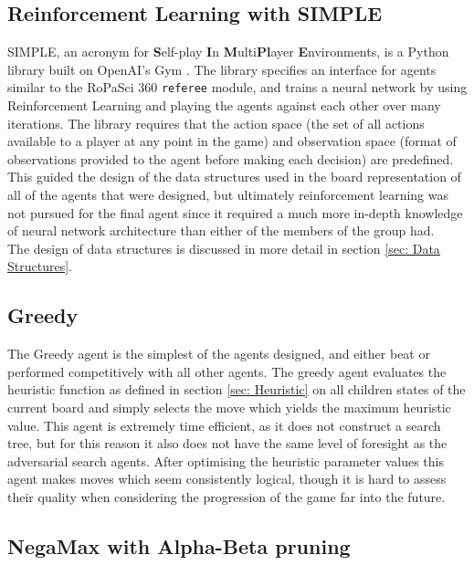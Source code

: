 \documentclass{article}
\begin{document}
\subsection{Reinforcement Learning with SIMPLE \cite{SIMPLE}}
SIMPLE, an acronym for \textbf{S}elf-play \textbf{I}n \textbf{M}ulti\textbf{Pl}ayer \textbf{E}nvironments, is a Python library built on OpenAI's Gym \cite{brockman2016openai}. The library specifies an interface for agents similar to the RoPaSci 360 \verb|referee| module, and trains a neural network by using Reinforcement Learning and playing the agents against each other over many iterations. The library requires that the action space (the set of all actions available to a player at any point in the game) and observation space (format of observations provided to the agent before making each decision) are predefined. This guided the design of the data structures used in the board representation of all of the agents that were designed, but ultimately reinforcement learning was not pursued for the final agent since it required a much more in-depth knowledge of neural network architecture than either of the members of the group had.\\[2mm]
The design of data structures is discussed in more detail in section \ref{sec: Data Structures}.

\subsection{Greedy}
The Greedy agent is the simplest of the agents designed, and either beat or performed competitively with all other agents. The greedy agent evaluates the heuristic function as defined in section \ref{sec: Heuristic} on all children states of the current board and simply selects the move which yields the maximum heuristic value. This agent is extremely time efficient, as it does not construct a search tree, but for this reason it also does not have the same level of foresight as the adversarial search agents. After optimising the heuristic parameter values this agent makes moves which seem consistently logical, though it is hard to assess their quality when considering the progression of the game far into the future.

\subsection{NegaMax with Alpha-Beta pruning}
\end{document}
